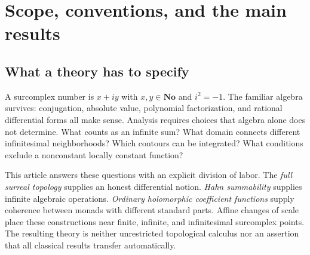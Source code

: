 \documentclass[11pt,oneside]{article}
\numberwithin{equation}{section}
\theoremstyle{definition}
\theoremstyle{remark}\newtheorem{remark}[theorem]{Remark}
\newcommand{\No}{\mathbf{No}}
\begin{document}
\section{Scope, conventions, and the main results}
\subsection{What a theory has to specify}
A surcomplex number is $x+iy$ with $x,y\in\No$ and $i^2=-1$. The familiar
algebra survives: conjugation, absolute value, polynomial factorization,
and rational differential forms all make sense. Analysis requires choices
that algebra alone does not determine. What counts as an infinite sum?
What domain connects different infinitesimal neighborhoods? Which contours
can be integrated? What conditions exclude a nonconstant locally constant
function?

This article answers these questions with an explicit division of labor.
The \emph{full surreal topology} supplies an honest differential notion.
\emph{Hahn summability} supplies infinite algebraic operations.
\emph{Ordinary holomorphic coefficient functions} supply coherence between
monads with different standard parts. Affine changes of scale place these
constructions near finite, infinite, and infinitesimal surcomplex points.
The resulting theory is neither unrestricted topological calculus nor an
assertion that all classical results transfer automatically.
\end{document}
